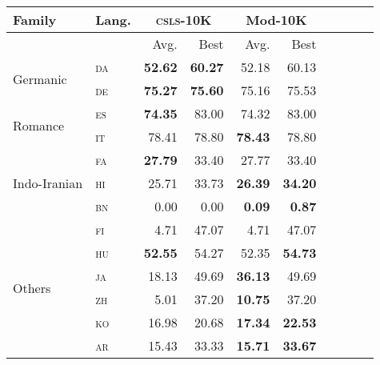 \begin{table}[!tb]
     \small
     \centering
     \begin{tabular}{llrrrrrrrr}
 \bf Family                      & \bf Lang.   & \multicolumn{2}{c}{\bf \textsc{csls}-10K} &  \multicolumn{2}{c}{\bf Mod-10K}   \\ \hline
                                 &             & Avg.           & Best                     & Avg.         & Best    \\ \hline
\multirow{2}{*}{Germanic}        & \textsc{da} &  \bf 52.62      &  \bf 60.27               & 52.18        & 60.13   \\
                                 & \textsc{de} &  \bf 75.27      &  \bf 75.60               & 75.16        & 75.53   \\ \hline
\multirow{2}{*}{Romance}         & \textsc{es} & \bf 74.35       &  83.00                   & 74.32        & 83.00   \\
                                 & \textsc{it} &   78.41         &  78.80                   & \bf 78.43    & 78.80   \\ \hline
\multirow{3}{0.7cm}{Indo-Iranian}& \textsc{fa} &  \bf 27.79      & 33.40                    & 27.77        & 33.40   \\
                                 & \textsc{hi} &  25.71          & 33.73                    & \bf 26.39    & \bf 34.20\\
                                 & \textsc{bn} &  0.00           & 0.00                     & \bf 0.09     & \bf 0.87 \\ \hline
\multirow{8}{*}{Others}          & \textsc{fi} &  4.71           & 47.07                    & 4.71         & 47.07    \\
                                 & \textsc{hu} & \bf 52.55       & 54.27                    & 52.35        & \bf 54.73\\
                                 & \textsc{ja} &  18.13          & 49.69                    & \bf 36.13    & 49.69     \\
                                 & \textsc{zh} &  5.01           & 37.20                    & \bf 10.75    & 37.20     \\
                                 & \textsc{ko} &  16.98          & 20.68                    & \bf 17.34    & \bf 22.53 \\
                                 & \textsc{ar} &  15.43          & 33.33                    & \bf 15.71    & \bf 33.67 \\

\end{tabular}
\end{table}
